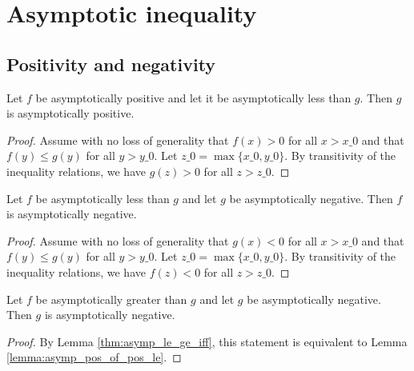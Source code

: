 \section{Asymptotic inequality}

\subsection{Positivity and negativity}

\begin{lemma}
    \label{lemma:asymp_pos_of_pos_le}
    \leanok
    Let $f$ be asymptotically positive and let it be asymptotically less than $g$.
    Then $g$ is asymptotically positive.
\end{lemma}

\begin{proof}
    \leanok
    Assume with no loss of generality that $f(x) > 0$ for all $x > x\_0$ and that
    $f(y) \le g(y)$ for all $y > y\_0$. Let $z\_0 = \max \{ x\_0, y\_0 \}$. By transitivity
    of the inequality relations, we have $g(z) > 0$ for all $z > z\_0$. 
\end{proof}

\begin{lemma}
    \label{lemma:asymp_neg_of_le_neg}
    \leanok
    Let $f$ be asymptotically less than $g$ and let $g$ be asymptotically negative.
    Then $f$ is asymptotically negative.
\end{lemma}

\begin{proof}
    \leanok
    Assume with no loss of generality that $g(x) < 0$ for all $x > x\_0$ and that
    $f(y) \le g(y)$ for all $y > y\_0$. Let $z\_0 = \max \{ x\_0, y\_0 \}$. By transitivity
    of the inequality relations, we have $f(z) < 0$ for all $z > z\_0$. 
\end{proof}

\begin{lemma}
    \label{lemma:asymp_pos_of_ge_pos}
    \leanok
    Let $f$ be asymptotically greater than $g$ and let $g$ be asymptotically negative.
    Then $g$ is asymptotically negative.
\end{lemma}

\begin{proof}
    \leanok
    By Lemma \ref{thm:asymp_le_ge_iff}, this statement is equivalent to Lemma
    \ref{lemma:asymp_pos_of_pos_le}.
\end{proof}

